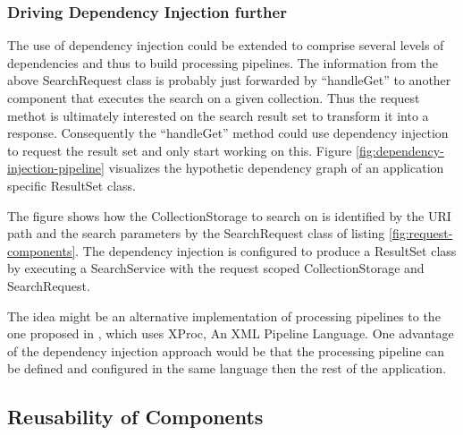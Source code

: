 \documentclass[12pt,a4paper,twoside]{scrartcl}		%
\begin{document}
\subsubsection{Driving Dependency Injection further}

The use of dependency injection could be extended to comprise several levels of
dependencies and thus to build processing pipelines.  The information from the
above SearchRequest class is probably just forwarded by ``handleGet'' to another
component that executes the search on a given collection. Thus the request
methot is ultimately interested on the search result set to transform it into a
response. Consequently the ``handleGet'' method could use dependency injection
to request the result set and only start working on this. Figure
\ref{fig:dependency-injection-pipeline} visualizes the hypothetic dependency
graph of an application specific ResultSet class.

The figure shows how the CollectionStorage to search on is identified by the URI
path and the search parameters by the SearchRequest class of listing
\ref{fig:request-components}. The dependency injection is configured to produce
a ResultSet class by executing a SearchService with the request scoped
CollectionStorage and SearchRequest.

The idea might be an alternative implementation of processing pipelines to the
one proposed in \cite{Davis:2011:XTR:1967428.1967437}, which uses XProc, An XML
Pipeline Language. One advantage of the dependency injection approach would be
that the processing pipeline can be defined and configured in the same language
then the rest of the application.



\subsection{Reusability of Components}
\label{sec:reus-comp}

\end{document}
